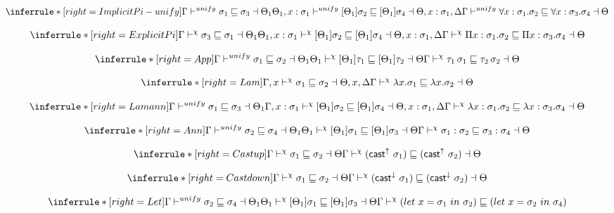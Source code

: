 \[
\inferrule*[right=ImplicitPi-unify]
{\Gamma \unify  \sigma_1 \sqsubseteq \sigma_3 \dashv \Theta_1 \\
\Theta_1, x:\sigma_1 \unify [\Theta_1]\sigma_2 \sqsubseteq [\Theta_1]\sigma_4 \dashv \Theta, x:\sigma_1, \Delta}
{ \Gamma \unify \forall x:\sigma_1. \sigma_2 \sqsubseteq \forall x:\sigma_3. \sigma_4 \dashv \Theta}
\]

\[
\inferrule*[right=ExplicitPi]
{\Gamma \dskunify  \sigma_3 \sqsubseteq \sigma_1 \dashv \Theta_1 \\
\Theta_1, x:\sigma_1 \dskunify [\Theta_1]\sigma_2 \sqsubseteq [\Theta_1]\sigma_4 \dashv \Theta, x:\sigma_1, \Delta}
{ \Gamma \dskunify \Pi x:\sigma_1. \sigma_2 \sqsubseteq \Pi x:\sigma_3. \sigma_4 \dashv \Theta}
\]

\[
\inferrule*[right=App]
{
\Gamma \unify \sigma_1 \sqsubseteq \sigma_2 \dashv \Theta_1 \\
\Theta_1 \dskunify [\Theta_1]\tau_1 \sqsubseteq [\Theta_1]\tau_2 \dashv \Theta
}
{\Gamma \dskunify \tau_1\, \sigma_1 \sqsubseteq \tau_2\, \sigma_2 \dashv \Theta}
\]

\[
\inferrule*[right=Lam]
{
\Gamma, x \dskunify \sigma_1 \sqsubseteq \sigma_2 \dashv \Theta, x, \Delta}
{\Gamma \dskunify \lambda x. \sigma_1 \sqsubseteq \lambda x. \sigma_2 \dashv \Theta }
\]


\[
\inferrule*[right=Lamann]
{
\Gamma \unify \sigma_1 \sqsubseteq \sigma_3 \dashv \Theta_1 \\
\Gamma, x:\sigma_1 \dskunify [\Theta_1]\sigma_2 \sqsubseteq [\Theta_1]\sigma_4 \dashv \Theta, x:\sigma_1, \Delta }
{\Gamma \dskunify \lambda x:\sigma_1. \sigma_2 \sqsubseteq \lambda x:\sigma_3. \sigma_4 \dashv \Theta
}
\]

\[
\inferrule*[right=Ann]
{
\Gamma \unify \sigma_2 \sqsubseteq \sigma_4 \dashv \Theta_1 \\
\Theta_1 \dskunify  [\Theta_1]\sigma_1 \sqsubseteq [\Theta_1]\sigma_3 \dashv \Theta }
{\Gamma \dskunify \sigma_1:\sigma_2 \sqsubseteq \sigma_3:\sigma_4 \dashv \Theta}
\]

\[
\inferrule*[right=Castup]
{
\Gamma \dskunify  \sigma_1 \sqsubseteq \sigma_2 \dashv \Theta}
{\Gamma \dskunify (\castupe \sigma_1) \sqsubseteq  (\castupe \sigma_2) \dashv \Theta}
\]

\[
\inferrule*[right=Castdown]
{
\Gamma \dskunify  \sigma_1 \sqsubseteq \sigma_2 \dashv \Theta}
{\Gamma \dskunify  (\castdowne \sigma_1) \sqsubseteq  (\castdowne \sigma_2) \dashv \Theta}
\]

\[
\inferrule*[right=Let]
{
\Gamma \unify \sigma_2 \sqsubseteq \sigma_4 \dashv \Theta_1 \\
\Theta_1 \dskunify  [\Theta_1]\sigma_1 \sqsubseteq [\Theta_1]\sigma_3 \dashv \Theta }
{\Gamma \dskunify  (let\ x = \sigma_1\ in\ \sigma_2) \sqsubseteq  (let\ x = \sigma_2\ in\ \sigma_4) }
\]

